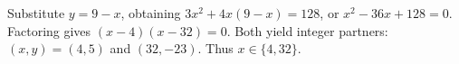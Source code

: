 Substitute $y=9-x$, obtaining $3x^2+4x(9-x)=128$, or $x^2-36x+128=0$. Factoring gives $(x-4)(x-32)=0$. Both yield integer partners: $(x,y)=(4,5)$ and $(32,-23)$. Thus $\boxed{x\in\{4,32\}}$.
